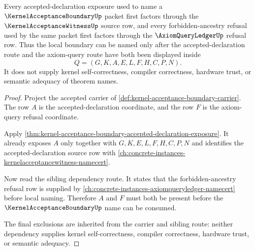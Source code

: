 \begin{theorem}
\label{thm:kernel-acceptance-boundary-acceptance-audit-dependency-route}
Every accepted-declaration exposure used to name a $\KernelAcceptanceBoundaryUp$ packet first factors through the $\KernelAcceptanceWitnessUp$ source row, and every forbidden-ancestry refusal used by the same packet first factors through the $\AxiomQueryLedgerUp$ refusal row. Thus the local boundary can be named only after the accepted-declaration route and the axiom-query route have both been displayed inside
$$
Q=(G,K,A,E,L,F,H,C,P,N).
$$
It does not supply kernel self-correctness, compiler correctness, hardware trust, or semantic adequacy of theorem names.
\end{theorem}
\begin{proof}
Project the accepted carrier of \autoref{def:kernel-acceptance-boundary-carrier}. The row $A$ is the accepted-declaration coordinate, and the row $F$ is the axiom-query refusal coordinate.

Apply \autoref{thm:kernel-acceptance-boundary-accepted-declaration-exposure}. It already exposes $A$ only together with $G,K,E,L,F,H,C,P,N$ and identifies the accepted-declaration source row with \autoref{ch:concrete-instances-kernelacceptancewitness-namecert}.

Now read the sibling dependency route. It states that the forbidden-ancestry refusal row is supplied by \autoref{ch:concrete-instances-axiomqueryledger-namecert} before local naming. Therefore $A$ and $F$ must both be present before the $\KernelAcceptanceBoundaryUp$ name can be consumed.

The final exclusions are inherited from the carrier and sibling route: neither dependency supplies kernel self-correctness, compiler correctness, hardware trust, or semantic adequacy.
\end{proof}
